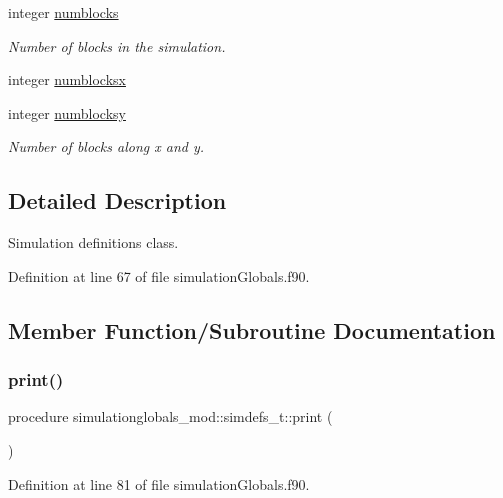 \begin{DoxyCompactItemize}
integer \mbox{\hyperlink{structsimulationglobals__mod_1_1simdefs__t_adf59068d8301acd45881aea6cccd8644}{numblocks}}
\begin{DoxyCompactList}\small\item\em Number of blocks in the simulation. \end{DoxyCompactList}\item 
integer \mbox{\hyperlink{structsimulationglobals__mod_1_1simdefs__t_a84c025bc82676caffdeaa8b32c3682c4}{numblocksx}}
\item 
integer \mbox{\hyperlink{structsimulationglobals__mod_1_1simdefs__t_aa20e28c5dfac72ea2f66d9058cc1971d}{numblocksy}}
\begin{DoxyCompactList}\small\item\em Number of blocks along x and y. \end{DoxyCompactList}\end{DoxyCompactItemize}


\subsection{Detailed Description}
Simulation definitions class. 

Definition at line 67 of file simulation\+Globals.\+f90.



\subsection{Member Function/\+Subroutine Documentation}
\mbox{\label{structsimulationglobals__mod_1_1simdefs__t_abac6acf320c42d22364f66677542fbfe}} 
\subsubsection{\texorpdfstring{print()}{print()}}
{\footnotesize\ttfamily procedure simulationglobals\+\_\+mod\+::simdefs\+\_\+t\+::print (\begin{DoxyParamCaption}{ }\end{DoxyParamCaption})\hspace{0.3cm}{\ttfamily [private]}}



Definition at line 81 of file simulation\+Globals.\+f90.

